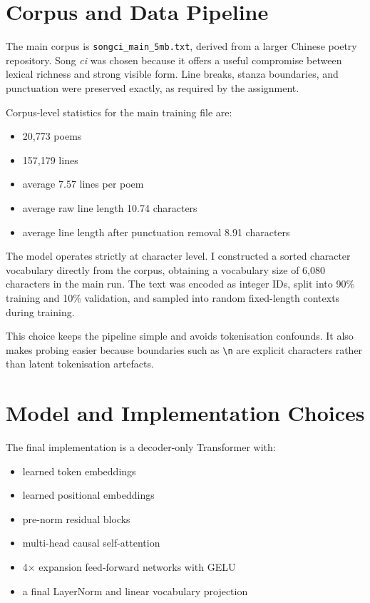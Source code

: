 \documentclass[11pt]{article}
\begin{document}
\section{Corpus and Data Pipeline}
The main corpus is \texttt{songci\_main\_5mb.txt}, derived from a larger Chinese poetry repository. Song \emph{ci} was chosen because it offers a useful compromise between lexical richness and strong visible form. Line breaks, stanza boundaries, and punctuation were preserved exactly, as required by the assignment.

Corpus-level statistics for the main training file are:
\begin{itemize}
    \item 20{,}773 poems
    \item 157{,}179 lines
    \item average 7.57 lines per poem
    \item average raw line length 10.74 characters
    \item average line length after punctuation removal 8.91 characters
\end{itemize}

The model operates strictly at character level. I constructed a sorted character vocabulary directly from the corpus, obtaining a vocabulary size of 6{,}080 characters in the main run. The text was encoded as integer IDs, split into 90\% training and 10\% validation, and sampled into random fixed-length contexts during training.

This choice keeps the pipeline simple and avoids tokenisation confounds. It also makes probing easier because boundaries such as \texttt{\textbackslash n} are explicit characters rather than latent tokenisation artefacts.

\section{Model and Implementation Choices}
The final implementation is a decoder-only Transformer with:
\begin{itemize}
    \item learned token embeddings
    \item learned positional embeddings
    \item pre-norm residual blocks
    \item multi-head causal self-attention
    \item 4$\times$ expansion feed-forward networks with GELU
    \item a final LayerNorm and linear vocabulary projection
\end{itemize}
\end{document}

